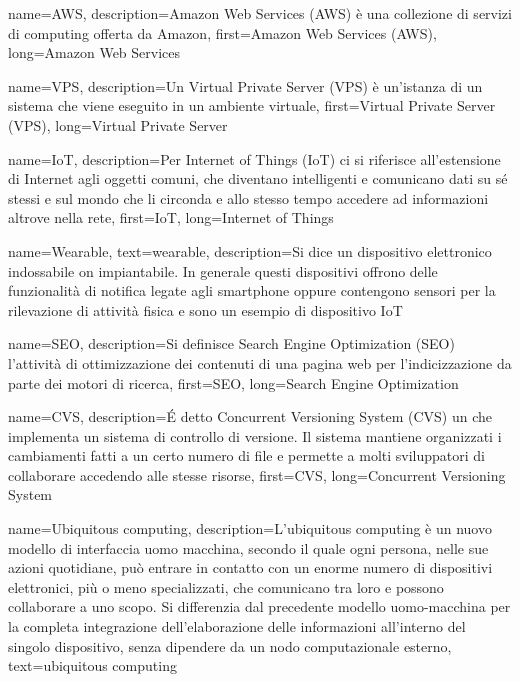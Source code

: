 {
    name={AWS},
    description={Amazon Web Services (AWS) è una collezione di servizi di  computing  offerta da Amazon},
    first={Amazon Web Services (AWS)},
    long={Amazon Web Services}
}

{
    name={VPS},
    description={Un Virtual Private Server (VPS) è un'istanza di un sistema che viene eseguito in un ambiente virtuale},
    first={Virtual Private Server (VPS)},
    long={Virtual Private Server}
}

{
    name={IoT},
    description={Per Internet of Things (IoT) ci si riferisce all'estensione di Internet agli oggetti comuni, che diventano intelligenti e comunicano dati su sé stessi e sul mondo che li circonda e allo stesso tempo accedere ad informazioni altrove nella rete},
    first={IoT},
    long={Internet of Things}
}

{
    name={Wearable},
    text={wearable},
    description={Si dice  un dispositivo elettronico indossabile on impiantabile. In generale questi dispositivi offrono delle funzionalità di notifica legate agli smartphone oppure contengono sensori per la rilevazione di attività fisica e sono un esempio di dispositivo \gls{IoT}}
}

{
    name={SEO},
    description={Si definisce Search Engine Optimization (SEO) l'attività di ottimizzazione dei contenuti di una pagina web per l'indicizzazione da parte dei motori di ricerca},
    first={SEO},
    long={Search Engine Optimization}
}

{
    name={CVS},
    description={É detto Concurrent Versioning System (CVS) un  che implementa un sistema di controllo di versione. Il sistema mantiene organizzati i cambiamenti fatti a un certo numero di file e permette a molti sviluppatori di collaborare accedendo alle stesse risorse},
    first={CVS},
    long={Concurrent Versioning System}
}

{
    name={Ubiquitous computing},
    description={L'ubiquitous computing è un nuovo modello di interfaccia uomo macchina, secondo il quale ogni persona, nelle sue azioni quotidiane, può entrare in contatto con un enorme numero di dispositivi elettronici, più o meno specializzati, che comunicano tra loro e possono collaborare a uno scopo. Si differenzia dal precedente modello uomo-macchina per la completa integrazione dell'elaborazione delle informazioni all'interno del singolo dispositivo, senza dipendere da un nodo computazionale esterno},
    text={ubiquitous computing}
}

